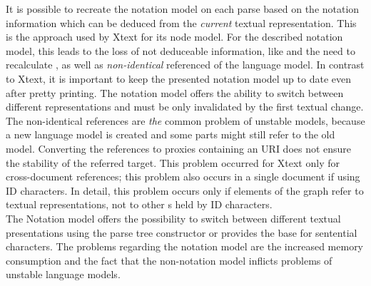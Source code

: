 It is possible to recreate the notation model on each parse based on the notation information which can be deduced from the \emph{current} textual representation. This is the approach used by Xtext for its node model. For the described notation model, this leads to the loss of not deduceable information, like  and the need to recalculate , as well as \emph{non-identical} referenced  of the language model. In contrast to Xtext, it is important to keep the presented notation model up to date even after pretty printing. The notation model offers the ability to switch between different representations and must be only invalidated by the first textual change. The non-identical references are \emph{the} common problem of unstable models, because a new language model is created and some parts might still refer to the old model. Converting the references to proxies containing an URI does not ensure the stability of the referred target. This problem occurred for Xtext only for cross-document references; this problem also occurs in a single document if using ID characters. In detail, this problem occurs only if elements of the  graph refer to textual representations, not to other s held by ID characters.\\
The Notation model offers the possibility to switch between different textual presentations using the parse tree constructor or provides the base for sentential characters. The problems regarding the notation model are the increased memory consumption and the fact that the non-notation model inflicts problems of unstable language models. 

